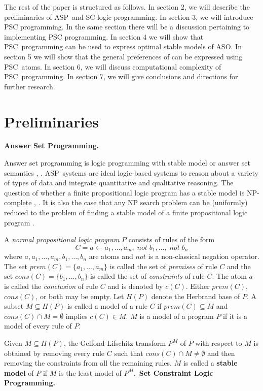 \documentclass[letterpaper]{article}\usepackage{aaai}
\begin{document}
The rest of the paper is structured as follows. In section 2, we will describe
the preliminaries of ASP\ and SC logic programming. In section 3, we will
introduce PSC programming. In the same section there will be a discussion
pertaining to implementing PSC programming. In section 4 we will show that
PSC\ programming can be used to express optimal stable models of ASO. In
section 5 we will show that the general preferences of \cite{SP} can be
expressed using PSC\ atoms. In section 6, we will discuss computational
complexity of PSC\ programming. In section 7, we will give conclusions and
directions for further research.

\section{Preliminaries}

\noindent\textbf{Answer Set Programming.}

Answer set programming is logic programming with stable model or answer set
semantics \cite{GL}, \cite{GL91}. ASP\ systems are ideal logic-based systems
to reason about a variety of types of data and integrate quantitative and
qualitative reasoning. The question of whether a finite propositional logic
program has a stable model is NP-complete \cite{Elkan}, \cite{MT}. It is also
the case that any NP search problem can be (uniformly) reduced to the problem
of finding a stable model of a finite propositional logic program \cite{MR2}.

A \emph{normal propositional logic program} $P$ consists of rules of the form
\[
C=a\leftarrow a_{1},...,a_{m},\;not\;b_{1},...,\;not\;b_{n}\]
where $a,a_{1},\ldots,a_{m},b_{1},\ldots,b_{n}$ are atoms and $not$ is a
non-classical negation operator. The set $prem\left(  C\right)  =\{a_{1},$...$,a_{m}\}$ is called the set of \textit{premises} of rule $C$ and the set
$cons\left(  C\right)  =\{b_{1},\ldots,b_{n}\}$ is called the set of
\textit{constraints} of rule $C$. The atom $a$ is called the
\textit{conclusion} of rule $C$ and is denoted by $c\left(  C\right)  $.
Either $prem(C)$, $cons(C)$, or both may be empty. Let $H(P)$ denote the
Herbrand base of $P$. A subset $M\subseteq H(P)$ is called a model of a rule
$C$ if $prem(C)\subseteq M$ and $cons(C)\cap M=\emptyset$ implies $c(C)\in M$.
$M$ is a model of a program $P $ if it is a model of every rule of $P$.

Given $M\subseteq H(P)$, the Gelfond-Lifschitz transform $P^{M}$ of $P$ with
respect to $M$ is obtained by removing every rule $C$ such that $cons\left(
C\right)  \cap M\neq\emptyset$ and then removing the constraints from all the
remaining rules. $M$ is called a \textbf{stable model }of $P$ if $M$ is the
least model of $P^{M}$.\newline\ \newline\textbf{Set Constraint Logic
Programming.}
\end{document}
